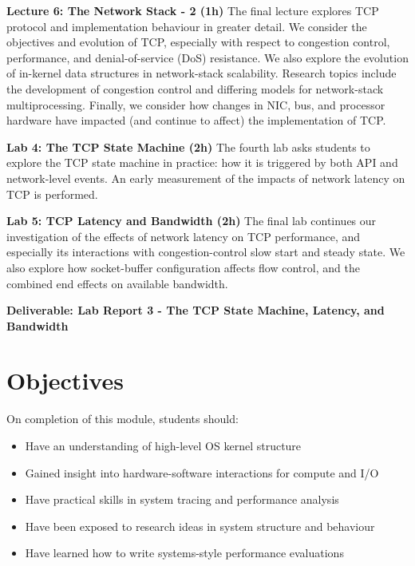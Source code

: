 \documentclass[a4paper,10pt]{article}
\begin{document}
\begin{description}
  \noindent
  \textbf{Lecture 6: The Network Stack - 2 (1h)}
  The final lecture explores TCP protocol and implementation behaviour in
  greater detail.
  We consider the objectives and evolution of TCP, especially with respect to
  congestion control, performance, and denial-of-service (DoS) resistance.
  We also explore the evolution of in-kernel data structures in network-stack
  scalability.
  Research topics include the development of congestion control and differing
  models for network-stack multiprocessing.
  Finally, we consider how changes in NIC, bus, and processor hardware have
  impacted (and continue to affect) the implementation of TCP.

  \noindent
  \textbf{Lab 4: The TCP State Machine (2h)}
  The fourth lab asks students to explore the TCP state machine in practice:
  how it is triggered by both API and network-level events.
  An early measurement of the impacts of network latency on TCP is performed.

  \noindent
  \textbf{Lab 5: TCP Latency and Bandwidth (2h)}
  The final lab continues our investigation of the effects of network latency
  on TCP performance, and especially its interactions with congestion-control
  slow start and steady state.
  We also explore how socket-buffer configuration affects flow control, and
  the combined end effects on available bandwidth.

  \noindent
  \textbf{Deliverable: Lab Report 3 - The TCP State Machine, Latency, and
    Bandwidth}
\end{description}

\section{Objectives}

On completion of this module, students should:

\begin{itemize}
\item Have an understanding of high-level OS kernel structure
\item Gained insight into hardware-software interactions for compute and I/O
\item Have practical skills in system tracing and performance analysis
\item Have been exposed to research ideas in system structure and behaviour
\item Have learned how to write systems-style performance evaluations
\end{itemize}
\end{document}
